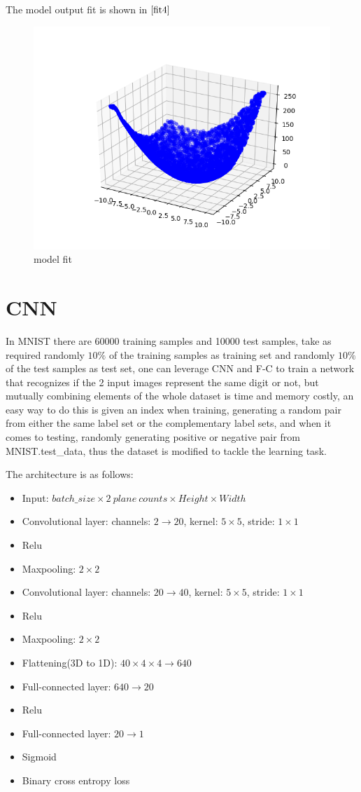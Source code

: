 \documentclass[a4paper,12pt]{article}
\begin{document}
The model output fit is shown in $\ref{fit4}$

\begin{figure}[htbp]
    \centering
    \includegraphics[width = .7\textwidth]{fit4}
    \caption{model fit}
    \label{fit4}
\end{figure}



\section{CNN}

In MNIST there are 60000 training samples and 10000 test samples, take as required randomly $10\%$ of the training samples as training set and randomly $10\%$ 
of the test samples as test set, one can leverage CNN and F-C to train a network that recognizes if the 2 input images represent the same digit or not, but mutually
combining elements of the whole dataset is time and memory costly, an easy way to do this is given an index when training, generating a random pair from either the same label set
or the complementary label sets, and when it comes to testing, randomly generating positive or negative pair from MNIST.test\_data, thus the dataset is modified to tackle
the learning task.

The architecture is as follows:
\begin{itemize}
    \item Input: $batch\_size \times 2 \ plane\ counts \times Height \times Width$
    \item Convolutional layer: channels: $2 \to 20$, kernel: $5\times5$, stride: $1 \times 1$
    \item Relu
    \item Maxpooling: $2\times 2$
    \item Convolutional layer: channels: $20 \to 40$, kernel: $5\times5$, stride: $1 \times 1$
    \item Relu
    \item Maxpooling: $2\times 2$
    \item Flattening(3D to 1D): $40 \times 4 \times 4 \to 640$
    \item Full-connected layer: $640 \to 20$
    \item Relu
    \item Full-connected layer: $20 \to 1$
    \item Sigmoid 
    \item Binary cross entropy loss
\end{itemize}
\end{document}
